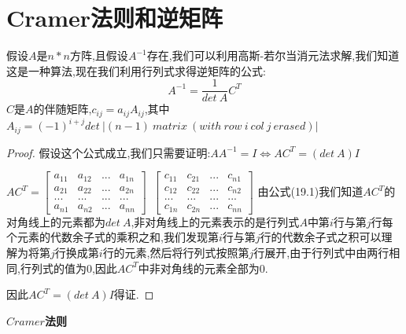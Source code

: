 \documentclass[oneside]{book}
\begin{document}
	\chapter{Cramer法则和逆矩阵}
	假设$A$是$n*n$方阵,且假设$A^{-1}$存在,我们可以利用高斯-若尔当消元法求解,我们知道这是一种算法,现在我们利用行列式求得逆矩阵的公式:
	\begin{equation}
		A^{-1}=\frac{1}{det\ A}C^{T}
	\end{equation}
	$C$是$A$的伴随矩阵,$c_{ij}=a_{ij}A_{ij}$,其中$A_{ij}=(-1)^{i+j}det\ |(n-1)\ matrix\ (with\ row\ i\ col\ j\ erased)|$
	\begin{proof}
		假设这个公式成立,我们只需要证明:$AA^{-1}=I\Leftrightarrow AC^{T}=(det\ A)I$
		
		$AC^{T}=\left[\begin{array}{cccc}
		a_{11}&a_{12}&...&a_{1n}\\a_{21}&a_{22}&...&a_{2n}\\...&...&...&...\\a_{n1}&a_{n2}&...&a_{nn}
		\end{array}\right]$\ $\left[\begin{array}{cccc}
		c_{11}&c_{21}&...&c_{n1}\\c_{12}&c_{22}&...&c_{n2}\\...&...&...&...\\c_{1n}&c_{2n}&...&c_{nn}
	\end{array}\right]$
	由公式(19.1)我们知道$AC^{T}$的对角线上的元素都为$det\ A$,非对角线上的元素表示的是行列式$A$中第$i$行与第$j$行每个元素的代数余子式的乘积之和,我们发现第$i$行与第$j$行的代数余子式之积可以理解为将第$j$行换成第$i$行的元素,然后将行列式按照第$j$行展开,由于行列式中由两行相同,行列式的值为0,因此$AC^{T}$中非对角线的元素全部为0.
	
	因此$AC^{T}=(det\ A)I$得证.
	
	\end{proof}
	\textbf{$Cramer$法则}
	
\end{document}
